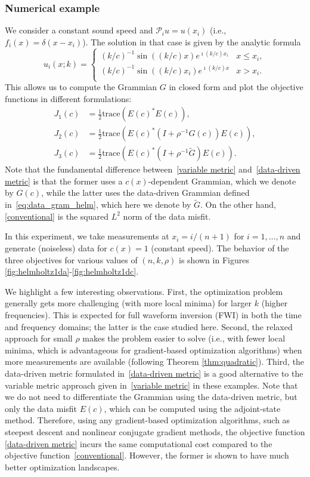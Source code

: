 \documentclass[12pt]{amsart}
\begin{document}
\subsubsection{Numerical example}
We consider a constant sound speed and $\mathcal{P}_iu = u(x_i)$ (i.e., $f_i(x) = \delta(x-x_i)$). The solution in that case is given by the analytic formula 
\[
u_i(x; k) = 
\begin{cases} 
(k/c)^{-1}\sin((k/c) x)e^{\imath (k/c) x_i}
& x \leq x_i, \\
(k/c)^{-1}\sin((k/c) x_i)e^{\imath (k/c) x}
& x > x_i. \\
\end{cases} 
\]
This allows us to compute the Grammian $G$ in closed form and plot the objective functions in different formulations:
\begin{align}
J_1(c) &= {\textstyle\frac{1}{2}}\text{trace}\left(E(c)^*E(c)\right),\label{conventional}\\
J_2(c) &= {\textstyle\frac{1}{2}}\text{trace}\left(E(c)^*\left(I + \rho^{-1}G(c)\right)E(c)\right),\label{variable metric}\\
J_3(c) &= {\textstyle\frac{1}{2}}\text{trace}\left(E(c)^*\left(I + \rho^{-1}\widetilde{G}\right)E(c)\right).\label{data-driven metric}
\end{align}
Note that the fundamental difference between~\eqref{variable metric} and~\eqref{data-driven metric} is that the former uses a $c(x)$-dependent Grammian, which we denote by $G(c)$, while the latter uses the data-driven Grammian defined in~\eqref{eq:data_gram_helm}, which here we denote by $\widetilde{G}$. On the other hand, \eqref{conventional} is the squared $L^2$ norm of the data misfit.

In this experiment, we take measurements at $x_i = i / (n+1)$ for $i = 1, \ldots, n$ and generate (noiseless) data for $c(x) = 1$ (constant speed). The behavior of the three objectives for various values of $(n, k, \rho)$ is shown in Figures \ref{fig:helmholtz1da}-\ref{fig:helmholtz1dc}.


We highlight a few interesting observations. First, the optimization problem generally gets more challenging (with more local minima) for larger $k$ (higher frequencies). This is expected for full waveform inversion (FWI) in both the time and frequency domains; the latter is the case studied here. Second, the relaxed approach for small $\rho$ makes the problem easier to solve (i.e., with fewer local minima, which is advantageous for gradient-based optimization algorithms) when more measurements are available (following Theorem \ref{thm:quadratic}). Third, the data-driven metric formulated in~\eqref{data-driven metric} is a good alternative to the variable metric approach given in~\eqref{variable metric} in these examples. Note that we do not need to differentiate the Grammian using the data-driven metric, but only the data misfit $E(c)$, which can be computed using the adjoint-state method. Therefore, using any gradient-based optimization algorithms, such as steepest descent and nonlinear conjugate gradient methods, the objective function \eqref{data-driven metric} incurs the same computational cost compared to the objective function~\eqref{conventional}. However, the former is shown to have much better optimization landscapes.
\end{document}
